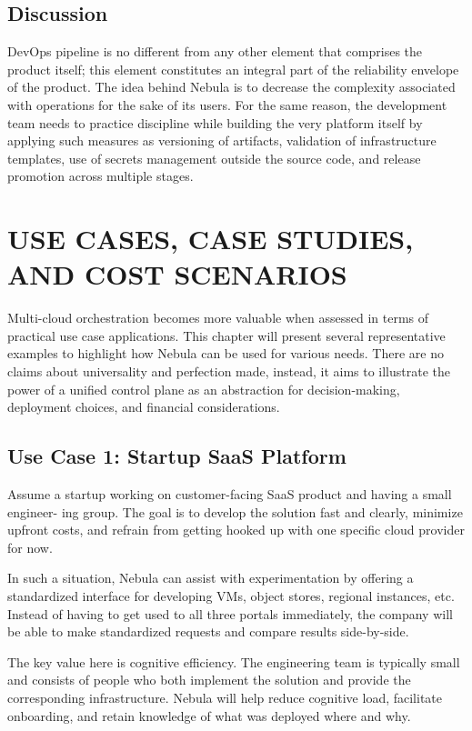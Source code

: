 \section{Discussion}
DevOps pipeline is no different from any other element that comprises the product itself; this element constitutes an integral part of the reliability envelope of the product. The idea behind Nebula is to decrease the complexity associated with operations for the sake of its users. For the same reason, the development team needs to practice discipline while building the very platform itself by applying such measures as versioning of artifacts, validation of infrastructure templates, use of secrets management outside the source code, and release promotion across multiple stages.

\newpage


\chapter{USE CASES, CASE STUDIES, AND COST SCENARIOS}
\thispagestyle{plain}

Multi-cloud orchestration becomes more valuable when assessed in terms of practical use case applications. This chapter will present several representative examples to highlight how Nebula can be used for various needs. There are no claims about universality and perfection made, instead, it aims to illustrate the power of a unified control plane as an abstraction for decision-making, deployment choices, and financial considerations.

\section{Use Case 1: Startup SaaS Platform}


Assume a startup working on customer-facing SaaS product and having a small engineer- ing group. The goal is to develop the solution fast and clearly, minimize upfront costs, and refrain from getting hooked up with one specific cloud provider for now. 


In such a situation, Nebula can assist with experimentation by offering a standardized interface for developing VMs, object stores, regional instances, etc. Instead of having to get used to all three portals immediately, the company will be able to make standardized requests and compare results side-by-side.


The key value here is cognitive efficiency. The engineering team is typically small and consists of people who both implement the solution and provide the corresponding infrastructure. Nebula will help reduce cognitive load, facilitate onboarding, and retain knowledge of what was deployed where and why.


